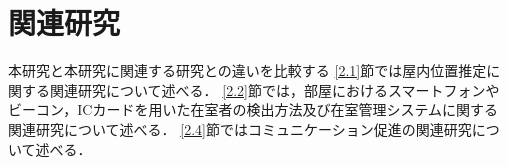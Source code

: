 \chapter{関連研究}\label{2}

本研究と本研究に関連する研究との違いを比較する
\ref{2.1}節では屋内位置推定に関する関連研究について述べる．
\ref{2.2}節では，部屋におけるスマートフォンやビーコン，ICカードを用いた在室者の検出方法及び在室管理システムに関する関連研究について述べる．
\ref{2.4}節ではコミュニケーション促進の関連研究について述べる．



% 



